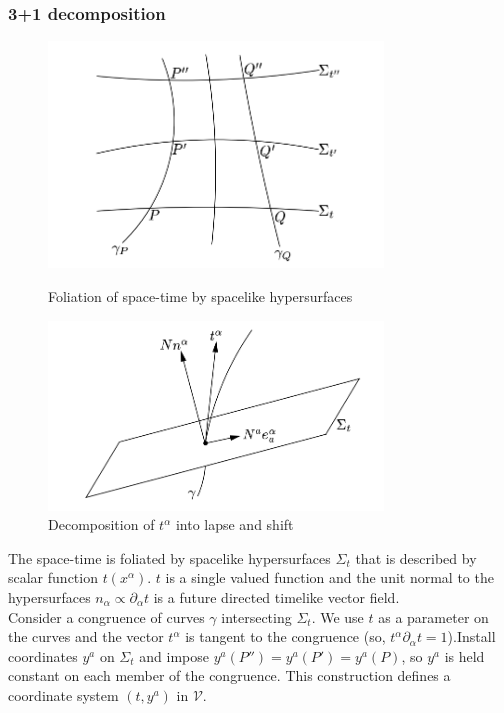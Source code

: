 \documentclass{article}
\begin{document}
\subsubsection{3+1 decomposition}
\begin{figure}
\begin{minipage}[t]{0.5\linewidth}
\centering
\includegraphics[width=3.5in]{./pic/Foliation1.png}
\caption{Foliation of space-time by spacelike hypersurfaces}
\label{fig:side:a}
\end{minipage}%
\begin{minipage}[t]{0.5\linewidth}
\centering
\includegraphics[width=3.5in]{./pic/Foliation2.png}
\caption{Decomposition of $t^{\alpha}$ into lapse and shift}
\label{fig:side:b}
\end{minipage}
\end{figure}
The space-time is foliated by spacelike hypersurfaces $\Sigma_t$ that is described by scalar function $t(x^{\alpha})$. $t$ is a single valued function and the unit normal to the hypersurfaces $n_{\alpha} \propto \partial_{\alpha} t$ is a future directed timelike vector field.\\
Consider a congruence of curves $\gamma$ intersecting $\Sigma_t$. We use $t$ as a parameter on the curves and the vector $t^{\alpha}$ is tangent to the congruence (so, $t^{\alpha} \partial_{\alpha}t = 1$).Install coordinates $y^a$ on $\Sigma_t$ and impose $y^a(P'') = y^a(P') = y^a(P)$, so $y^a$ is held constant on each member of the congruence. This construction defines a coordinate system $(t,y^a)$ in $\mathcal{V}$.\\
\end{document}
